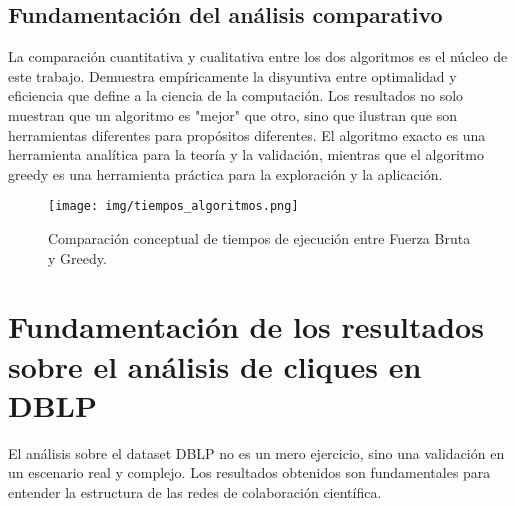 \documentclass[12pt,a4paper]{report}
\begin{document}
\subsection{Fundamentación del análisis comparativo}
La comparación cuantitativa y cualitativa entre los dos algoritmos es el núcleo de este trabajo. Demuestra empíricamente la disyuntiva entre optimalidad y eficiencia que define a la ciencia de la computación. Los resultados no solo muestran que un algoritmo es "mejor" que otro, sino que ilustran que son herramientas diferentes para propósitos diferentes. El algoritmo exacto es una herramienta analítica para la teoría y la validación, mientras que el algoritmo greedy es una herramienta práctica para la exploración y la aplicación.

\begin{figure}[H]
    \centering
    \texttt{[image: img/tiempos\_algoritmos.png]}
    \caption{Comparación conceptual de tiempos de ejecución entre Fuerza Bruta y Greedy.}
    \label{fig:tiempos_ejecucion}
\end{figure}

\section{Fundamentación de los resultados sobre el análisis de cliques en DBLP}

El análisis sobre el dataset DBLP no es un mero ejercicio, sino una validación en un escenario real y complejo. Los resultados obtenidos son fundamentales para entender la estructura de las redes de colaboración científica.
\end{document}
